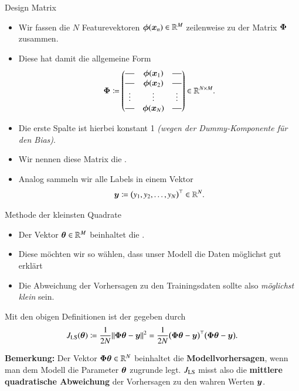 \begin{frame}{Design Matrix}{}
	\begin{itemize}
		\item Wir fassen die $N$ Featurevektoren $\bm{\phi}(\bm{x}_n) \in \mathbb{R}^M$ zeilenweise zu der Matrix $\bm{\Phi}$ zusammen.
		\item Diese hat damit die allgemeine Form
		\begin{equation*}
			\bPhi \coloneqq
			\begin{pmatrix}
				\horzbar 	& \bphi(\bx_1) 	& \horzbar 	\\
				\horzbar 	& \bphi(\bx_2) 	& \horzbar 	\\
				\vdots 	&\vdots 		& \vdots 		\\
				\horzbar 	& \bphi(\bx_N) 	& \horzbar
			\end{pmatrix} \in \R^{N \times M}.
		\end{equation*}
		\item Die erste Spalte ist hierbei konstant 1 \textit{(wegen der Dummy-Komponente für den Bias)}.
		\item Wir nennen diese Matrix die .
		\item Analog sammeln wir alle Labels in einem Vektor
		\begin{equation*}
			\bm{y} \coloneqq \bigl( y_1, y_2, \ldots, y_N \bigr)^\top \in \mathbb{R}^N.
		\end{equation*}
	\end{itemize}
\end{frame}


\begin{frame}{Methode der kleinsten Quadrate}{}
	\begin{itemize}
		\item Der Vektor $\bm{\theta} \in \mathbb{R}^M$ beinhaltet die .
		\item Diese möchten wir so wählen, dass unser Modell die Daten möglichst gut erklärt
		\item Die Abweichung der Vorhersagen zu den Trainingsdaten sollte also \textit{möglichst klein} sein.
	\end{itemize}

	\begin{mydef}
		Mit den obigen Definitionen ist der  gegeben durch
		\begin{equation*}
			J_{\text{LS}}(\bm{\theta})
				\coloneqq \frac{1}{2N} \Vert \bm{\Phi} \bm{\theta} - \bm{y} \Vert^2
				= \frac{1}{2N} \bigl( \bm{\Phi} \bm{\theta} - \bm{y} \bigr)^\top \bigl( \bm{\Phi} \bm{\theta} - \bm{y} \bigr).
		\end{equation*}
	\end{mydef}

	\begin{boxGray}
		\textbf{Bemerkung:} Der Vektor $\bm{\Phi} \bm{\theta} \in \mathbb{R}^N$ beinhaltet die \textbf{Modellvorhersagen},
		wenn man dem Modell die Parameter $\bm{\theta}$ zugrunde legt.
		$J_{\text{LS}}$ misst also die \textbf{mittlere quadratische Abweichung} der Vorhersagen zu den wahren Werten $\bm{y}$.
	\end{boxGray}
\end{frame}



